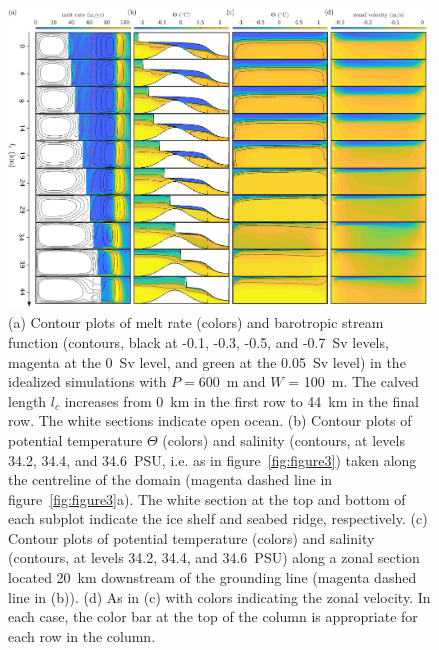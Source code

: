 \documentclass[draft]{agujournal2019}
\begin{document}
\begin{figure}
    \centering
    \includegraphics[width = 0.99\textwidth]{../make_figures/plots/figure5.pdf}
    \caption{(a) Contour plots of melt rate (colors) and barotropic stream function (contours, black at -0.1, -0.3, -0.5, and -0.7~Sv levels, magenta at the 0~Sv level, and green at the 0.05~Sv level) in the idealized simulations with $P = 600$~m and $W$ = 100~m. The calved length $l_c$ increases from 0~km in the first row to 44~km in the final row. The white sections indicate open ocean. (b) Contour plots of potential temperature $\Theta$ (colors) and salinity (contours, at levels 34.2, 34.4, and 34.6~PSU, i.e. as in figure~\ref{fig:figure3}) taken along the centreline of the domain (magenta dashed line in figure~\ref{fig:figure3}a). The white section at the top and bottom of each subplot indicate the ice shelf and seabed ridge, respectively. (c) Contour plots of potential temperature (colors) and salinity (contours, at levels 34.2, 34.4, and 34.6~PSU) along a zonal section located 20~km downstream of the grounding line (magenta dashed line in (b)). (d) As in (c) with colors indicating the zonal velocity.  In each case, the color bar at the top of the column is appropriate for each row in the column. }
    \label{fig:figure5}
\end{figure}
\end{document}
